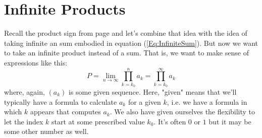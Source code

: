 \section{Infinite Products}
Recall the product sign from page \pageref{Sec:SumsAndProducts} and let's combine that idea with the idea of taking infinite an sum embodied in equation (\ref{Eq:InfiniteSum}). But now we want to take an infinite product instead of a sum. That is, we want to make sense of expressions like this:
\begin{equation}
\label{Eq:InfiniteProduct}
P = \lim_{n \rightarrow \infty} \prod_{k=k_0}^n a_k
  = \prod_{k=k_0}^{\infty} a_k
\end{equation}
where, again, $(a_k)$ is some given sequence. Here, "given" means that we'll typically have a formula to calculate $a_k$ for a given $k$, i.e. we have a formula in which $k$ appears that computes $a_k$. We also have given ourselves the flexibility to let the index $k$ start at some prescribed value $k_0$. It's often $0$ or $1$ but it may be some other number as well. 



